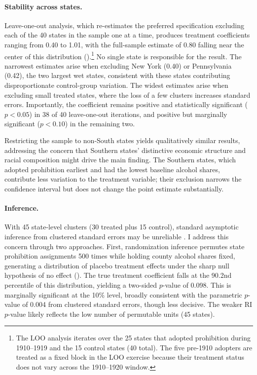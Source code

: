 \documentclass[12pt]{article}
\begin{document}
\paragraph{Stability across states.} Leave-one-out analysis, which re-estimates the preferred specification excluding each of the 40 states in the sample one at a time, produces treatment coefficients ranging from 0.40 to 1.01, with the full-sample estimate of 0.80 falling near the center of this distribution ().\footnote{The LOO analysis iterates over the 25 states that adopted prohibition during 1910--1919 and the 15 control states (40 total). The five pre-1910 adopters are treated as a fixed block in the LOO exercise because their treatment status does not vary across the 1910--1920 window.} No single state is responsible for the result. The narrowest estimates arise when excluding New York (0.40) or Pennsylvania (0.42), the two largest wet states, consistent with these states contributing disproportionate control-group variation. The widest estimates arise when excluding small treated states, where the loss of a few clusters increases standard errors. Importantly, the coefficient remains positive and statistically significant ($p < 0.05$) in 38 of 40 leave-one-out iterations, and positive but marginally significant ($p < 0.10$) in the remaining two.

Restricting the sample to non-South states yields qualitatively similar results, addressing the concern that Southern states' distinctive economic structure and racial composition might drive the main finding. The Southern states, which adopted prohibition earliest and had the lowest baseline alcohol shares, contribute less variation to the treatment variable; their exclusion narrows the confidence interval but does not change the point estimate substantially.

\paragraph{Inference.} With 45 state-level clusters (30 treated plus 15 control), standard asymptotic inference from clustered standard errors may be unreliable \citep{cameron2008}. I address this concern through two approaches. First, randomization inference permutes state prohibition assignments 500 times while holding county alcohol shares fixed, generating a distribution of placebo treatment effects under the sharp null hypothesis of no effect (). The true treatment coefficient falls at the 90.2nd percentile of this distribution, yielding a two-sided $p$-value of 0.098. This is marginally significant at the 10\% level, broadly consistent with the parametric $p$-value of 0.004 from clustered standard errors, though less decisive. The weaker RI $p$-value likely reflects the low number of permutable units (45 states).
\end{document}

